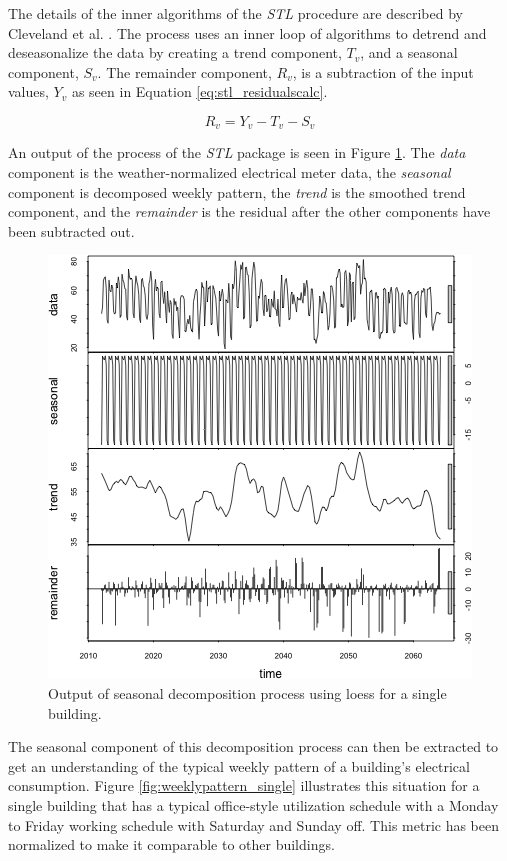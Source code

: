 The details of the inner algorithms of the \emph{STL} procedure are described by Cleveland et al. \citep{cleveland1990stl}. The process uses an inner loop of algorithms to detrend and deseasonalize the data by creating a trend component, $T_v$, and a seasonal component, $S_v$. The remainder component, $R_v$, is a subtraction of the input values, $Y_v$ as seen in Equation \ref{eq:stl_residualscalc}.

\begin{equation}
\label{eq:stl_residualscalc}
R_v = Y_v - T_v - S_v
\end{equation}

 An output of the process of the \emph{STL} package is seen in Figure \ref{fig:stl_decomposition}. The \emph{data} component is the weather-normalized electrical meter data, the \emph{seasonal} component is decomposed weekly pattern, the \emph{trend} is the smoothed trend component, and the \emph{remainder} is the residual after the other components have been subtracted out.


\begin{figure}[ht!]
\begin{center}
\includegraphics[width=0.7\columnwidth]{figures/stl_explanation/stl_explanation}
\caption{Output of seasonal decomposition process using loess for a single building.
\label{fig:stl_decomposition}%
}
\end{center}
\end{figure}

The seasonal component of this decomposition process can then be extracted to get an understanding of the typical weekly pattern of a building's electrical consumption. Figure \ref{fig:weeklypattern_single} illustrates this situation for a single building that has a typical office-style utilization schedule with a Monday to Friday working schedule with Saturday and Sunday off. This metric has been normalized to make it comparable to other buildings.

